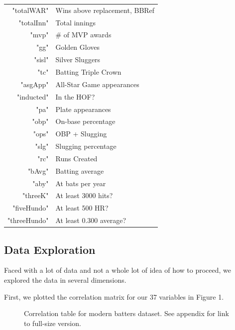 \documentclass[letterpaper, 10 pt, conference]{ieeeconf}
\begin{document}
\begin{table}[h]
\begin{tabular}{@{}rl@{}}
"totalWAR"    & Wins above replacement, BBRef \\
"totalInn"    & Total innings                 \\
"mvp"         & \# of MVP awards              \\
"gg"          & Golden Gloves                 \\
"sisl"        & Silver Sluggers               \\
"tc"          & Batting Triple Crown          \\
"asgApp"      & All-Star Game appearances     \\
"inducted"    & In the HOF?                   \\
"pa"          & Plate appearances             \\
"obp"         & On-base percentage            \\
"ops"         & OBP + Slugging                \\
"slg"         & Slugging percentage           \\
"rc"          & Runs Created                  \\
"bAvg"        & Batting average               \\
"aby"         & At bats per year              \\
"threeK"      & At least 3000 hits?           \\
"fiveHundo"   & At least 500 HR?              \\
"threeHundo"  & At least 0.300 average?       \\ \bottomrule
\end{tabular}
\end{table}

\subsection{Data Exploration}
Faced with a lot of data and not a whole lot of idea of how to proceed, we explored the data in several dimensions.

First, we plotted the correlation matrix for our 37 variables in Figure 1.

\begin{figure}[thpb]
\centering
{}
\caption{Correlation table for modern batters dataset. See appendix for link to full-size version.}
\label{figurelabel}
\end{figure}
\end{document}

